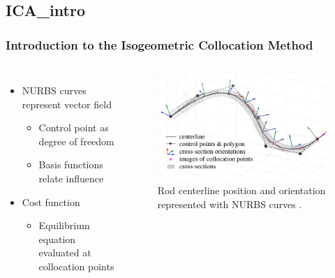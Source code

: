 \documentclass[compress]{thesisbeamer}
\begin{document}
		\subsection{ICA_intro}
        \begin{frame}
        	\frametitle{Introduction to the Isogeometric Collocation Method}
			\begin{columns}
			\begin{itemize}%
  				\item NURBS curves represent vector field
  				\begin{itemize}
  					\item Control point as degree of freedom
  					\item Basis functions relate influence
  				\end{itemize}
  				\item Cost function
  				\begin{itemize}
  					\item Equilibrium equation evaluated at collocation points
  				\end{itemize}
 			\end{itemize}
			\begin{figure}[h]
				\centering
				\includegraphics[width=\textwidth]{images/ICA}
				\caption{Rod centerline position and orientation represented with NURBS curves \cite{piegl_nurbs_1997}.}
			\end{figure}
			\end{columns}
		\end{frame}
		
\end{document}
